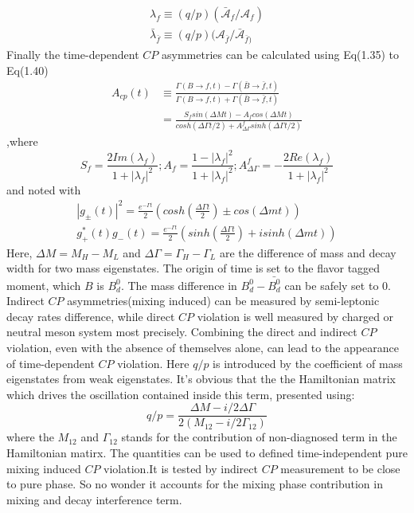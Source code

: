 \begin{eqnarray}
\lambda_f \equiv (q/p) (\bar{\mathcal{A}}_f / \mathcal{A}_f)\\
\bar{\lambda}_{\bar{f}} \equiv (q/p) ( \mathcal{A}_{\bar{f}}/\bar{\mathcal{A}}_{\bar{f})}
\end{eqnarray} 
Finally the time-dependent $CP$ asymmetries can be calculated using Eq(1.35) to  Eq(1.40)
\begin{equation}
\begin{split}
A_{cp}(t)&\equiv \frac{\Gamma(B\to f,t)-\Gamma(\bar{B}\to \bar{f},t)}{\Gamma(B\to f,t)+\Gamma(\bar{B}\to \bar{f},t)}\\
&=\frac{S_f sin(\Delta{M}t)-A_fcos(\Delta{M}t)}
{cosh(\Delta \Gamma t/2)+A^f_{\Delta \Gamma}sinh(\Delta \Gamma t/2)}
\end{split}
\end{equation},where
\begin{equation}
S_f=\frac{2Im(\lambda_f)}{1+|\lambda_f|^2};A_f=\frac{1-|\lambda_f|^2}{1+|\lambda_f|^2};A^f_{\Delta \Gamma}=-\frac{2Re(\lambda_f)}{1+|\lambda_f|^2}
\end{equation}
and noted with 
\begin{eqnarray}
|g_{\pm}(t)|^2=\frac{e^{-\Gamma t}}{2}(cosh(\frac{\Delta \Gamma t}{2})\pm cos(\Delta m t))\\
g_{+}^*(t)g_{-}(t)=\frac{e^{-\Gamma t}}{2}(sinh(\frac{\Delta \Gamma t}{2})+ isinh(\Delta m t))
\end{eqnarray}
Here, $\Delta{M}=M_H-M_L$ and $\Delta{\Gamma}=\Gamma_H-\Gamma_L$ are the difference of mass and decay width for two mass eigenstates. The origin of time is set to the flavor tagged moment, which $B$ is $B^0_d$. The mass difference in $B_d^0-\bar{B_d^0}$ can be safely set to 0.
Indirect $CP$ asymmetries(mixing induced) can be measured by semi-leptonic decay rates difference, while direct $CP$ violation is well measured by charged or neutral meson system most precisely. Combining the direct and indirect $CP$ violation, even with the absence of themselves alone, can lead to the appearance of time-dependent $CP$ violation. Here $q/p$ is introduced by the coefficient of mass eigenstates from weak eigenstates. It's obvious that the the Hamiltonian matrix which drives the oscillation contained inside this term, presented using: 
\begin{equation}
q/p = \frac{\Delta M - i/2 \Delta \Gamma}{2(M_{12}- i/2 \Gamma_{12})}
\end{equation}
where the $M_{12}$ and $\Gamma_{12}$ stands for the contribution of non-diagnosed term in the Hamiltonian matirx. The quantities can be used to defined time-independent pure mixing induced $CP$ violation.It is tested by indirect $CP$ measurement to be close to pure phase. So no wonder it accounts for the mixing phase contribution in mixing and decay interference term.


